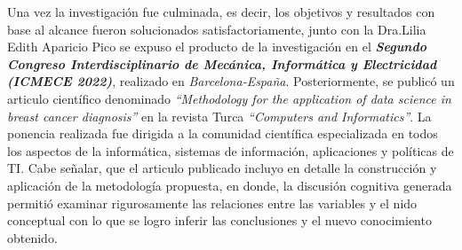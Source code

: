 Una vez la investigación fue culminada, es decir, los objetivos y resultados con base al alcance fueron solucionados satisfactoriamente, junto con la Dra.Lilia Edith Aparicio Pico se expuso el producto de la investigación en el \textit{\textbf{Segundo Congreso Interdisciplinario de Mecánica, Informática y Electricidad (ICMECE 2022)}}, realizado en \textit{Barcelona-España}. Posteriormente, se publicó un articulo científico denominado \textit{``Methodology for the application of data science in breast cancer diagnosis''} en la revista Turca \textit{``Computers and Informatics''}. La ponencia realizada fue dirigida a la comunidad científica especializada en todos los aspectos de la informática, sistemas de información, aplicaciones y políticas de TI. Cabe señalar, que el articulo publicado incluyo en detalle la construcción y aplicación de la metodología propuesta, en donde, la discusión cognitiva generada permitió examinar rigurosamente las relaciones entre las variables y el nido conceptual con lo que se logro inferir las conclusiones y el nuevo conocimiento obtenido.



